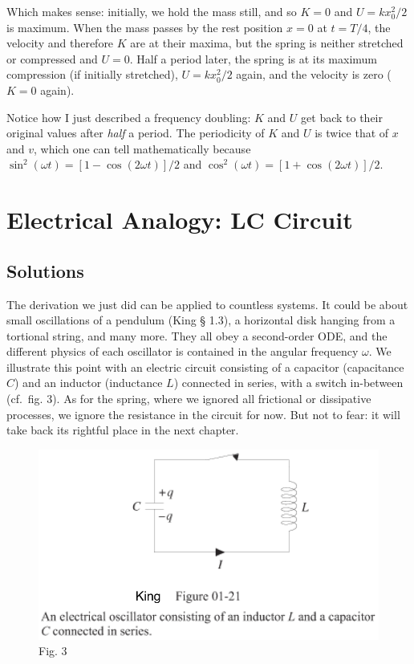 \documentclass[11pt]{article}
\makeatletter
\def\maxwidth{\ifdim\Gin@nat@width>\linewidth\linewidth
    \else\Gin@nat@width\fi}
\let\Oldincludegraphics\includegraphics
\renewcommand{\includegraphics}[1]{\Oldincludegraphics[width=.8\maxwidth]{#1}}
\makeatother
\begin{document}
    Which makes sense: initially, we hold the mass still, and so \(K=0\) and
\(U = kx_0^2/2\) is maximum. When the mass passes by the rest position
\(x=0\) at \(t=T/4\), the velocity and therefore \(K\) are at their
maxima, but the spring is neither stretched or compressed and \(U=0\).
Half a period later, the spring is at its maximum compression (if
initially stretched), \(U = kx_0^2/2\) again, and the velocity is zero
(\(K=0\) again).

Notice how I just described a frequency doubling: \(K\) and \(U\) get
back to their original values after \emph{half} a period. The
periodicity of \(K\) and \(U\) is twice that of \(x\) and \(v\), which
one can tell mathematically because
\(\sin^2(\omega t) = [1 - \cos(2\omega t)]/2\) and
\(\cos^2(\omega t) = [1 + \cos(2\omega t)]/2\).

    \section{Electrical Analogy: LC
Circuit}\label{electrical-analogy-lc-circuit}

    \subsection{Solutions}\label{solutions}

    The derivation we just did can be applied to countless systems. It could
be about small oscillations of a pendulum (King § 1.3), a horizontal
disk hanging from a tortional string, and many more. They all obey a
second-order ODE, and the different physics of each oscillator is
contained in the angular frequency \(\omega\). We illustrate this point
with an electric circuit consisting of a capacitor (capacitance \(C\))
and an inductor (inductance \(L\)) connected in series, with a switch
in-between (cf.~fig. 3). As for the spring, where we ignored all
frictional or dissipative processes, we ignore the resistance in the
circuit for now. But not to fear: it will take back its rightful place
in the next chapter.

    \begin{figure}
\centering
\includegraphics{LC_circuit.png}
\caption{Fig. 3}
\end{figure}
\end{document}
